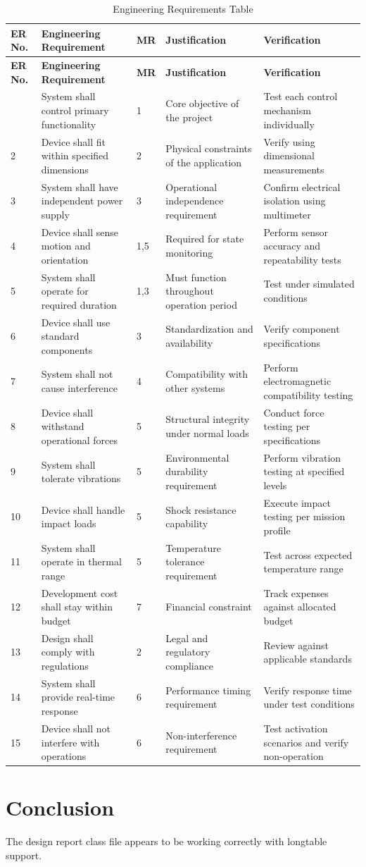 \documentclass{../designreport}
\begin{document}
\begin{longtable}{|p{1cm}|p{4cm}|p{1cm}|p{4cm}|p{4cm}|}
\caption{Engineering Requirements Table} \label{tab:engineering-requirements} \\
\hline
\textbf{ER No.} & \textbf{Engineering Requirement} & \textbf{MR} & \textbf{Justification} & \textbf{Verification} \\
\hline
\endfirsthead
\hline
\textbf{ER No.} & \textbf{Engineering Requirement} & \textbf{MR} & \textbf{Justification} & \textbf{Verification} \\
\hline
\endhead
\hline
\endfoot
\hline
\endlastfoot
1 & System shall control primary functionality & 1 & Core objective of the project & Test each control mechanism individually \\
\hline
2 & Device shall fit within specified dimensions & 2 & Physical constraints of the application & Verify using dimensional measurements \\
\hline
3 & System shall have independent power supply & 3 & Operational independence requirement & Confirm electrical isolation using multimeter \\
\hline
4 & Device shall sense motion and orientation & 1,5 & Required for state monitoring & Perform sensor accuracy and repeatability tests \\
\hline
5 & System shall operate for required duration & 1,3 & Must function throughout operation period & Test under simulated conditions \\
\hline
6 & Device shall use standard components & 3 & Standardization and availability & Verify component specifications \\
\hline
7 & System shall not cause interference & 4 & Compatibility with other systems & Perform electromagnetic compatibility testing \\
\hline
8 & Device shall withstand operational forces & 5 & Structural integrity under normal loads & Conduct force testing per specifications \\
\hline
9 & System shall tolerate vibrations & 5 & Environmental durability requirement & Perform vibration testing at specified levels \\
\hline
10 & Device shall handle impact loads & 5 & Shock resistance capability & Execute impact testing per mission profile \\
\hline
11 & System shall operate in thermal range & 5 & Temperature tolerance requirement & Test across expected temperature range \\
\hline
12 & Development cost shall stay within budget & 7 & Financial constraint & Track expenses against allocated budget \\
\hline
13 & Design shall comply with regulations & 2 & Legal and regulatory compliance & Review against applicable standards \\
\hline
14 & System shall provide real-time response & 6 & Performance timing requirement & Verify response time under test conditions \\
\hline
15 & Device shall not interfere with operations & 6 & Non-interference requirement & Test activation scenarios and verify non-operation \\
\hline
\end{longtable}

\section{Conclusion}

The design report class file appears to be working correctly with longtable support.
\end{document}
